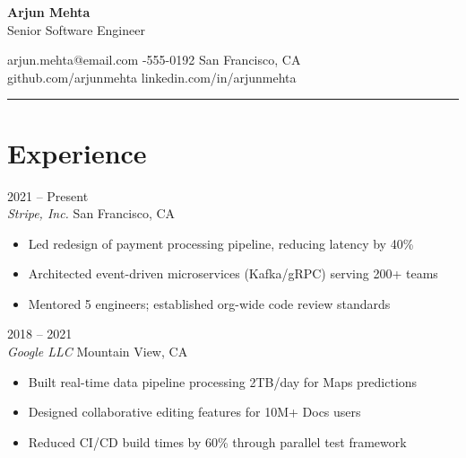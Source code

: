 \documentclass[10pt,letterpaper]{article}
\begin{document}
{\fontsize{24}{28}\selectfont\bfseries\color{dark} Arjun Mehta}\\[4pt]
{\large\color{accent} Senior Software Engineer}

\vspace{8pt}
{\small\color{mid}
 \enspace arjun.mehta@email.com \quad
{} -555-0192 \quad
{} \enspace San Francisco, CA \\[3pt]
 \enspace github.com/arjunmehta \quad
{} \enspace linkedin.com/in/arjunmehta
}

\vspace{4pt}
\textcolor{accent}{\rule{\textwidth}{1.5pt}}

\section{ \enspace Experience}

 \hfill {\small\color{mid} 2021 -- Present}\\
{\color{accent}\textit{Stripe, Inc.}} \hfill {\small\color{mid} San Francisco, CA}
\begin{itemize}[leftmargin=1.2em, label={\textcolor{accent}{}}, topsep=2pt, itemsep=1pt]
  \item Led redesign of payment processing pipeline, reducing latency by 40\%
  \item Architected event-driven microservices (Kafka/gRPC) serving 200+ teams
  \item Mentored 5 engineers; established org-wide code review standards
\end{itemize}

\vspace{6pt}
 \hfill {\small\color{mid} 2018 -- 2021}\\
{\color{accent}\textit{Google LLC}} \hfill {\small\color{mid} Mountain View, CA}
\begin{itemize}[leftmargin=1.2em, label={\textcolor{accent}{}}, topsep=2pt, itemsep=1pt]
  \item Built real-time data pipeline processing 2TB/day for Maps predictions
  \item Designed collaborative editing features for 10M+ Docs users
  \item Reduced CI/CD build times by 60\% through parallel test framework
\end{itemize}
\end{document}
